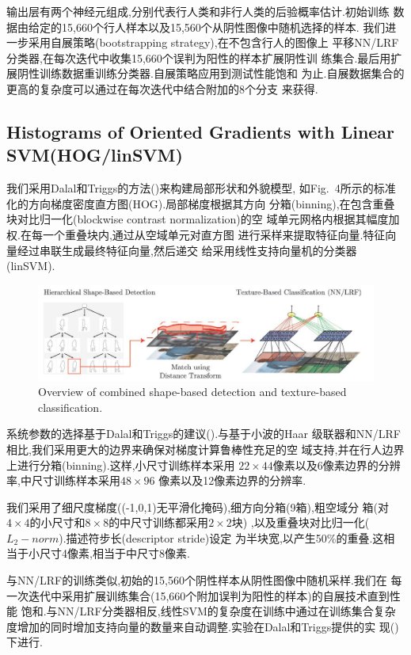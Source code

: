 \documentclass[10pt,letterpaper,journal,compsoc]{IEEEtran}
\begin{document}
输出层有两个神经元组成,分别代表行人类和非行人类的后验概率估计.初始训练
数据由给定的15,660个行人样本以及15,560个从阴性图像中随机选择的样本.
我们进一步采用自展策略(bootstrapping strategy),在不包含行人的图像上
平移NN/LRF分类器,在每次迭代中收集15,660个误判为阳性的样本扩展阴性训
练集合.最后用扩展阴性训练数据重训练分类器.自展策略应用到测试性能饱和
为止.自展数据集合的更高的复杂度可以通过在每次迭代中结合附加的8个分支
来获得.

\subsection{Histograms of Oriented Gradients with Linear SVM(HOG/linSVM)}
我们采用Dalal和Triggs的方法(\cite{bib11})来构建局部形状和外貌模型,
如Fig.~4所示的标准化的方向梯度密度直方图(HOG).局部梯度根据其方向
分箱(binning),在包含重叠块对比归一化(blockwise contrast normalization)的空
域单元网格内根据其幅度加权.在每一个重叠块内,通过从空域单元对直方图
进行采样来提取特征向量.特征向量经过串联生成最终特征向量,然后递交
给采用线性支持向量机的分类器(linSVM).

\begin{figure}[!b]
\centering
\includegraphics[width=7in]{fig5.JPG}
\caption{Overview of combined shape-based detection and texture-based classification.}
\end{figure}
系统参数的选择基于Dalal和Triggs的建议(\cite{bib11}).与基于小波的Haar
级联器和NN/LRF相比,我们采用更大的边界来确保对梯度计算鲁棒性充足的空
域支持,并在行人边界上进行分箱(binning).这样,小尺寸训练样本采用
$22\times44$像素以及6像素边界的分辨率,中尺寸训练样本采用$48\times96$
像素以及12像素边界的分辨率.

我们采用了细尺度梯度((-1,0,1)无平滑化掩码),细方向分箱(9箱),粗空域分
箱(对$4\times4$的小尺寸和$8\times8$的中尺寸训练都采用$2\times2$块)
,以及重叠块对比归一化($L_2-norm$).描述符步长(descriptor stride)设定
为半块宽,以产生50\%的重叠.这相当于小尺寸4像素,相当于中尺寸8像素.

与NN/LRF的训练类似,初始的15,560个阴性样本从阴性图像中随机采样.我们在
每一次迭代中采用扩展训练集合(15,660个附加误判为阳性的样本)的自展技术直到性能
饱和.与NN/LRF分类器相反,线性SVM的复杂度在训练中通过在训练集合复杂
度增加的同时增加支持向量的数量来自动调整.实验在Dalal和Triggs提供的实
现(\cite{bib11})下进行.
\end{document}
